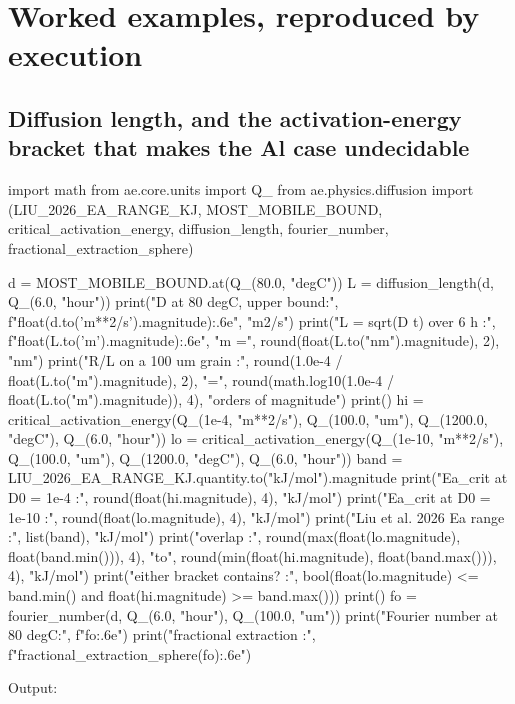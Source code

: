 \documentclass[10pt,a4paper,twoside]{report}
\begin{document}
\section{Worked examples, reproduced by execution}

\subsection*{Diffusion length, and the activation-energy bracket that makes the Al case undecidable}

\begin{doctestblock}
import math
from ae.core.units import Q_
from ae.physics.diffusion import (LIU_2026_EA_RANGE_KJ, MOST_MOBILE_BOUND,
                                  critical_activation_energy, diffusion_length,
                                  fourier_number, fractional_extraction_sphere)

d = MOST_MOBILE_BOUND.at(Q_(80.0, "degC"))
L = diffusion_length(d, Q_(6.0, "hour"))
print("D at 80 degC, upper bound:", f"{float(d.to('m**2/s').magnitude):.6e}", "m2/s")
print("L = sqrt(D t) over 6 h   :", f"{float(L.to('m').magnitude):.6e}", "m =",
      round(float(L.to("nm").magnitude), 2), "nm")
print("R/L on a 100 um grain    :", round(1.0e-4 / float(L.to("m").magnitude), 2),
      "=", round(math.log10(1.0e-4 / float(L.to("m").magnitude)), 4), "orders of magnitude")
print()
hi = critical_activation_energy(Q_(1e-4, "m**2/s"), Q_(100.0, "um"),
                                Q_(1200.0, "degC"), Q_(6.0, "hour"))
lo = critical_activation_energy(Q_(1e-10, "m**2/s"), Q_(100.0, "um"),
                                Q_(1200.0, "degC"), Q_(6.0, "hour"))
band = LIU_2026_EA_RANGE_KJ.quantity.to("kJ/mol").magnitude
print("Ea_crit at D0 = 1e-4     :", round(float(hi.magnitude), 4), "kJ/mol")
print("Ea_crit at D0 = 1e-10    :", round(float(lo.magnitude), 4), "kJ/mol")
print("Liu et al. 2026 Ea range :", list(band), "kJ/mol")
print("overlap                  :", round(max(float(lo.magnitude), float(band.min())), 4),
      "to", round(min(float(hi.magnitude), float(band.max())), 4), "kJ/mol")
print("either bracket contains? :",
      bool(float(lo.magnitude) <= band.min() and float(hi.magnitude) >= band.max()))
print()
fo = fourier_number(d, Q_(6.0, "hour"), Q_(100.0, "um"))
print("Fourier number at 80 degC:", f"{fo:.6e}")
print("fractional extraction    :", f"{fractional_extraction_sphere(fo):.6e}")
\end{doctestblock}

{\footnotesize\color{slate}Output:\par}
\end{document}
